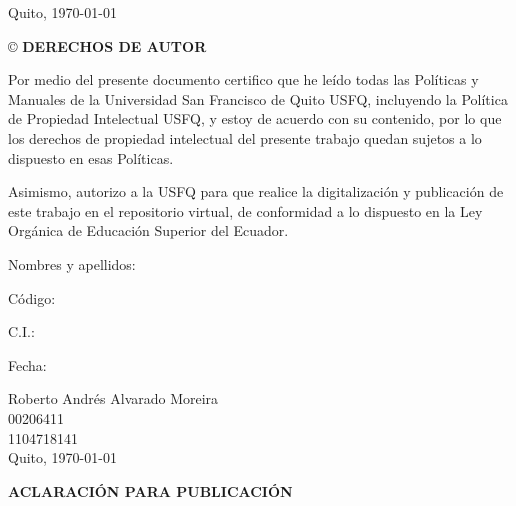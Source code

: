 \documentclass[a4paper, 12pt]{report}
\begin{document}
\vfill 
\begin{center}
\normalsize Quito, \today
\end{center}

\newpage
\begin{center}
\begin{large}
\copyright \hspace{0.1cm} \textbf{DERECHOS DE AUTOR}
\end{large}
\end{center}

\normalsize Por medio del presente documento certifico que he leído todas las Políticas y Manuales de la Universidad San Francisco de Quito USFQ, incluyendo la Política de Propiedad Intelectual USFQ, y estoy de acuerdo con su contenido, por lo que los derechos de propiedad intelectual del presente trabajo quedan sujetos a lo dispuesto en esas Políticas. 

\normalsize Asimismo, autorizo a la USFQ para que realice la digitalización y publicación de este trabajo en el repositorio virtual, de conformidad a lo dispuesto en la Ley Orgánica de Educación Superior del Ecuador.



\vspace{5cm}
\noindent
\begin{minipage}{0.3\linewidth}   
  \small Nombres y apellidos:
  \vspace{0.7cm}

  \small Código:
  \vspace{0.7cm}

  \small C.I.:
  \vspace{0.7cm}

  \small Fecha:
  \vspace{0.7cm}

\end{minipage}
\begin{minipage}{0.7\linewidth}
  \small Roberto Andrés Alvarado Moreira
  \vspace{0.7cm}\\
  \small 00206411
  \vspace{0.7cm}\\
  \small 1104718141
  \vspace{0.7cm}\\
  \small Quito, \today
  \vspace{0.7cm}

\end{minipage}


\newpage
\begin{center}
\begin{LARGE}
\textbf{ACLARACIÓN PARA PUBLICACIÓN}
\end{LARGE}
\end{center}
\end{document}
